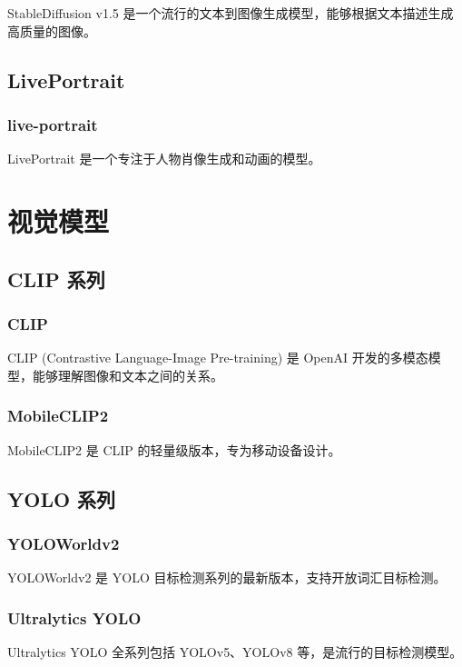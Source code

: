 \documentclass[12pt,UTF8]{ctexbook}
\begin{document}
StableDiffusion v1.5 是一个流行的文本到图像生成模型，能够根据文本描述生成高质量的图像。

\section{LivePortrait}

\subsection{live-portrait}

LivePortrait 是一个专注于人物肖像生成和动画的模型。

\chapter{视觉模型}

\section{CLIP 系列}

\subsection{CLIP}

CLIP (Contrastive Language-Image Pre-training) 是 OpenAI 开发的多模态模型，能够理解图像和文本之间的关系。

\subsection{MobileCLIP2}

MobileCLIP2 是 CLIP 的轻量级版本，专为移动设备设计。

\section{YOLO 系列}

\subsection{YOLOWorldv2}

YOLOWorldv2 是 YOLO 目标检测系列的最新版本，支持开放词汇目标检测。

\subsection{Ultralytics YOLO}

Ultralytics YOLO 全系列包括 YOLOv5、YOLOv8 等，是流行的目标检测模型。
\end{document}

